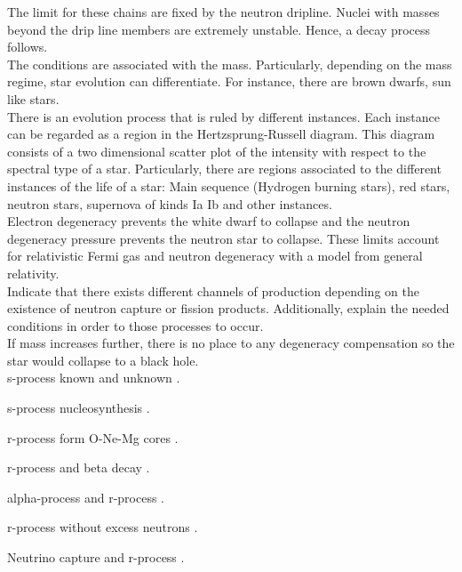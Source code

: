 \documentclass[openany]{book}
\begin{document}
The limit for these chains are fixed by the neutron dripline. Nuclei with masses beyond the drip line members are extremely unstable. Hence, a decay process follows. \\

The conditions are associated with the mass. Particularly, depending on the mass regime, star evolution can differentiate. For instance, there are brown dwarfs, sun like stars. \\

There is an evolution process that is ruled by different instances. Each instance can be regarded as a region in the Hertzsprung-Russell diagram. This diagram consists of a two dimensional scatter plot of the intensity with respect to the spectral type of a star. Particularly, there are regions associated to the different instances of the life of a star: Main sequence (Hydrogen burning stars), red stars, neutron stars, supernova of kinds Ia Ib and other instances. \\

Electron degeneracy prevents the white dwarf to collapse and the neutron degeneracy pressure prevents the neutron star to collapse. These limits account for relativistic Fermi gas and neutron degeneracy with a model from general relativity. \\

Indicate that there exists different channels of production depending on the existence of neutron capture or fission products. Additionally, explain the needed conditions in order to those processes to occur. \\ 

If mass increases further, there is no place to any degeneracy compensation so the star would collapse to a black hole. \\

s-process known and unknown \cite{lattanzio_lugaro_2005}.

s-process nucleosynthesis \cite{kappeler_2005}.

r-process form O-Ne-Mg cores \cite{wanajo_tamamura_itoh_nomoto_ishimaru_beers_nozawa_2003}.

r-process and beta decay \cite{suzuki_shibagaki_yoshida_kajino_otsuka_2018}.

alpha-process and r-process \cite{woosley_hoffman_1992}.

r-process without excess neutrons \cite{meyer_2002}.

Neutrino capture and r-process \cite{meyer_mclaughlin_fuller_1998}.
\end{document}
